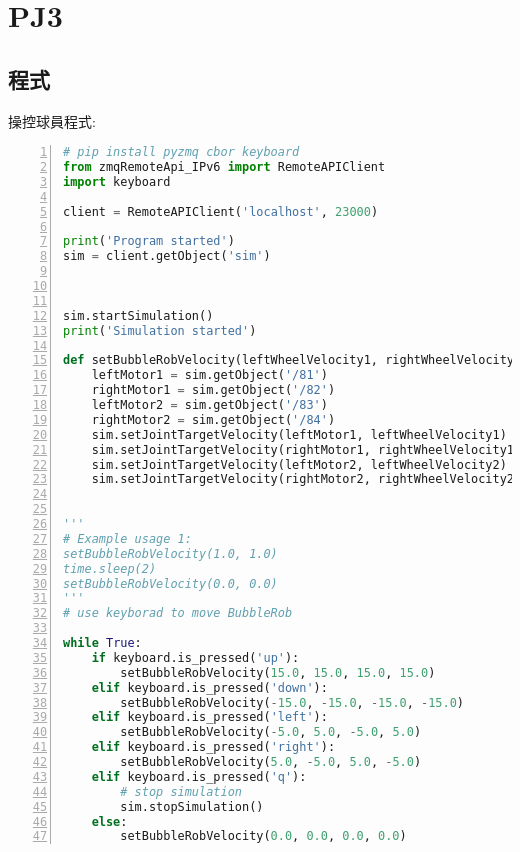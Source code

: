 \chapter{PJ3}

\section{程式}

操控球員程式:
\begin{lstlisting}[language=Python, frame=single, numbers=left, captionpos=b, basicstyle=\ttfamily\small, showstringspaces=false, breaklines=true, tabsize=4, xleftmargin=15pt]
# pip install pyzmq cbor keyboard
from zmqRemoteApi_IPv6 import RemoteAPIClient
import keyboard
 
client = RemoteAPIClient('localhost', 23000)
 
print('Program started')
sim = client.getObject('sim')
 
 
 
sim.startSimulation()
print('Simulation started')
 
def setBubbleRobVelocity(leftWheelVelocity1, rightWheelVelocity1, leftWheelVelocity2, rightWheelVelocity2):
    leftMotor1 = sim.getObject('/81')
    rightMotor1 = sim.getObject('/82')
    leftMotor2 = sim.getObject('/83')
    rightMotor2 = sim.getObject('/84')
    sim.setJointTargetVelocity(leftMotor1, leftWheelVelocity1)
    sim.setJointTargetVelocity(rightMotor1, rightWheelVelocity1)
    sim.setJointTargetVelocity(leftMotor2, leftWheelVelocity2)
    sim.setJointTargetVelocity(rightMotor2, rightWheelVelocity2)
    
 
'''
# Example usage 1:
setBubbleRobVelocity(1.0, 1.0)
time.sleep(2)
setBubbleRobVelocity(0.0, 0.0)
'''
# use keyborad to move BubbleRob
 
while True:
    if keyboard.is_pressed('up'):
        setBubbleRobVelocity(15.0, 15.0, 15.0, 15.0)
    elif keyboard.is_pressed('down'):
        setBubbleRobVelocity(-15.0, -15.0, -15.0, -15.0)
    elif keyboard.is_pressed('left'):
        setBubbleRobVelocity(-5.0, 5.0, -5.0, 5.0)
    elif keyboard.is_pressed('right'):
        setBubbleRobVelocity(5.0, -5.0, 5.0, -5.0)
    elif keyboard.is_pressed('q'):
        # stop simulation
        sim.stopSimulation()
    else:
        setBubbleRobVelocity(0.0, 0.0, 0.0, 0.0)
\end{lstlisting}


